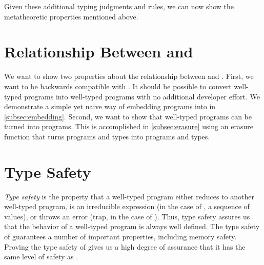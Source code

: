 Given these additional typing judgments and rules, we can now show the metatheoretic properties mentioned above.

\section{Relationship Between \wasm and \name}
We want to show two properties about the relationship between \wasm and \name.
First, we want \name to be backwards compatible with \wasm.
It should be possible to convert well-typed \wasm programs into well-typed \name programs with no additional developer effort.
We demonstrate a simple yet naive way of embedding \wasm programs into \name in \autoref{subsec:embedding}.
Second, we want to show that well-typed \name programs can be turned into \wasm programs.
This is accomplished in \autoref{subsec:erasure} using an erasure function that turns \name programs and types into \wasm programs and types.




\section{Type Safety}
\label{sec:typesafety}
\emph{Type safety} is the property that a well-typed program either reduces to another well-typed program, is an irreducible expression (in the case of \name, a sequence of values), or throws an error (trap, in the case of \name).
Thus, type safety assures us that the behavior of a well-typed program is always well defined.
The type safety of \wasm guarantees a number of important properties, including memory safety.
Proving the type safety of \name gives us a high degree of assurance that it has the same level of safety as \wasm.




